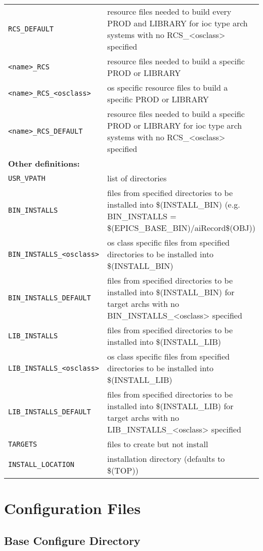 \begin{center}
\begin{longtable}{p{2.94784in}p{3.76247in}}
\verb|RCS_DEFAULT| & resource files needed to build every PROD and LIBRARY for ioc type arch systems with no RCS\_\textless{}osclass\textgreater{} specified\\
\verb|<name>_RCS| & resource files needed to build a specific PROD or LIBRARY\\
\verb|<name>_RCS_<osclass>| & os specific resource files to build a specific PROD or LIBRARY\\
\verb|<name>_RCS_DEFAULT| & resource files needed to build a specific PROD or LIBRARY for ioc type arch systems with no RCS\_\textless{}osclass\textgreater{} specified\\
\textbf{Other definitions: } &    \\
\verb|USR_VPATH| & list of directories\\
\verb|BIN_INSTALLS| & files from specified directories to be installed into \$(INSTALL\_BIN) (e.g. BIN\_INSTALLS = \$(EPICS\_BASE\_BIN)/aiRecord\$(OBJ))\\
\verb|BIN_INSTALLS_<osclass>| & os class specific files from specified directories to be installed into \$(INSTALL\_BIN)\\
\verb|BIN_INSTALLS_DEFAULT| & files from specified directories to be installed into \$(INSTALL\_BIN) for target archs with no BIN\_INSTALLS\_\textless{}osclass\textgreater{} specified\\
\verb|LIB_INSTALLS| & files from specified directories to be installed into \$(INSTALL\_LIB)\\
\verb|LIB_INSTALLS_<osclass>| & os class specific files from specified directories to be installed into \$(INSTALL\_LIB)\\
\verb|LIB_INSTALLS_DEFAULT| & files from specified directories to be installed into \$(INSTALL\_LIB) for target archs with no LIB\_INSTALLS\_\textless{}osclass\textgreater{} specified\\
\verb|TARGETS| & files to create but not install\\
\verb|INSTALL_LOCATION| & installation directory (defaults to \$(TOP))
\end{longtable}\end{center}


\section{Configuration Files}

\subsection{Base Configure Directory}

